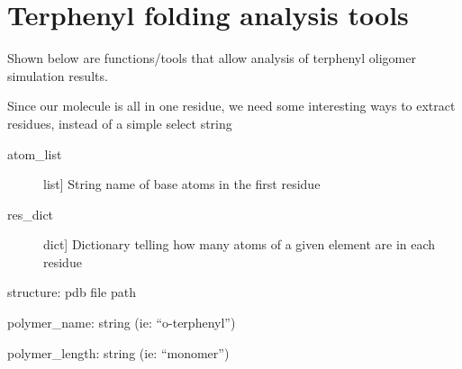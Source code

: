 \documentclass[letterpaper,12pt,english,openany,oneside]{sphinxmanual}
\begin{document}
\chapter{Terphenyl folding analysis tools}
\label{\detokenize{analysis:terphenyl-folding-analysis-tools}}\label{\detokenize{analysis::doc}}
Shown below are functions/tools that allow analysis of terphenyl oligomer simulation results.

\label{\detokenize{analysis:module-analysis}}

\begin{fulllineitems}
\label{\detokenize{analysis:analysis.construct_selector}}
Since our molecule is all in one residue, we need some interesting ways to extract residues, instead of a simple
select string
\begin{description}
\item[{atom\_list}] \leavevmode{[}list{]}
String name of base atoms in the first residue

\item[{res\_dict}] \leavevmode{[}dict{]}
Dictionary telling how many atoms of a given element are in each residue

\end{description}

\end{fulllineitems}


\begin{fulllineitems}
\label{\detokenize{analysis:analysis.get_internal_coordinate_definitions}}
structure: pdb file path

polymer\_name: string (ie: “o-terphenyl”)

polymer\_length: string (ie: “monomer”)

\end{fulllineitems}
\end{document}
